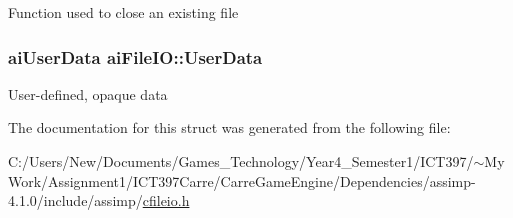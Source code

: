 Function used to close an existing file \hypertarget{structai_file_i_o_9c62b7f3d70fbb2f41e33ad0b9933139}{
\subsubsection[UserData]{\setlength{\rightskip}{0pt plus 5cm}aiUserData {\bf aiFileIO::UserData}}}
\label{structai_file_i_o_9c62b7f3d70fbb2f41e33ad0b9933139}


User-defined, opaque data 

The documentation for this struct was generated from the following file:\begin{CompactItemize}
\item 
C:/Users/New/Documents/Games\_\-Technology/Year4\_\-Semester1/ICT397/$\sim$My Work/Assignment1/ICT397Carre/CarreGameEngine/Dependencies/assimp-4.1.0/include/assimp/\hyperlink{cfileio_8h}{cfileio.h}\end{CompactItemize}
